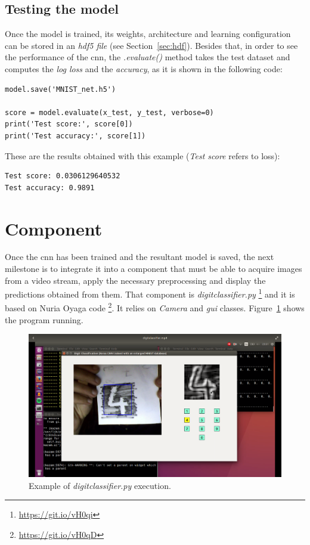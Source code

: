 \subsection{Testing the model}
Once the model is trained, its weights, architecture and learning configuration can be stored in an \emph{\gls{hdf5} file} (see Section~\ref{sec:hdf}). Besides that, in order to see the performance of the \gls{cnn}, the \textit{.evaluate()} method takes the test dataset and computes the \emph{log loss} and the \emph{accuracy}, as it is shown in the following code:
\begin{lstlisting}
model.save('MNIST_net.h5')

score = model.evaluate(x_test, y_test, verbose=0)
print('Test score:', score[0])
print('Test accuracy:', score[1])
\end{lstlisting}
These are the results obtained with this example (\textit{Test score} refers to loss):
\begin{Verbatim}[frame=single]
Test score: 0.0306129640532
Test accuracy: 0.9891
\end{Verbatim}

\section{Component}\label{sec:component}
Once the \gls{cnn} has been trained and the resultant model is saved, the next milestone is to integrate it into a component that must be able to acquire images from a video stream, apply the necessary preprocessing and display the predictions obtained from them. That component is \emph{\textit{digitclassifier.py}} \footnote{\url{https://git.io/vH0qi}} and it is based on Nuria Oyaga code \footnote{\url{https://git.io/vH0qD}}. It relies on \textit{Camera} and \textit{\gls{gui}} classes. Figure~\ref{fig:digitclass} shows the program running.

\begin{figure}
	\centering
	\includegraphics[width=1\linewidth, keepaspectratio]{figures/digitclass.png}
	\caption{Example of \textit{digitclassifier.py} execution.}
	\label{fig:digitclass}
\end{figure}


